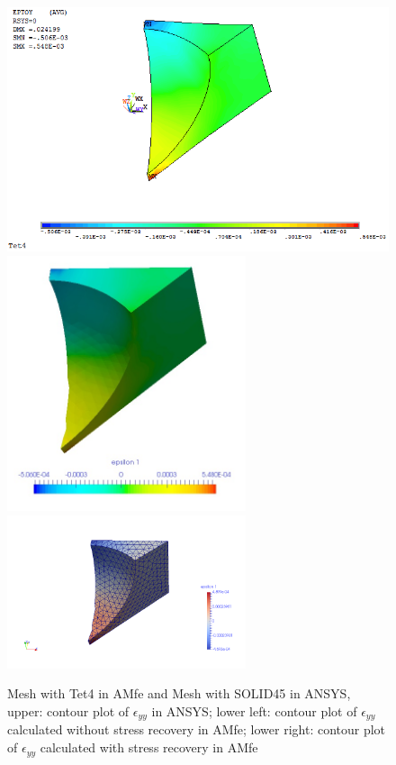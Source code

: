 \begin{figure}[htbp]
	\begin{center}
		\includegraphics[width=13cm,clip]{Tet4Eyy.png} 		
		\includegraphics[width=7cm,clip]{Tet4EyyPD.png} 
		\includegraphics[width=7cm,clip]{Tet4EyyP.png} 		
		\caption{Mesh with Tet4 in AMfe and Mesh with SOLID45 in ANSYS, upper: contour plot of $\epsilon_{yy}$ in ANSYS; lower left: contour plot of $\epsilon_{yy}$ calculated without stress recovery in AMfe; lower right: contour plot of $\epsilon_{yy}$ calculated with stress recovery in AMfe} \label{fig: Tet4_Eyy}
	\end{center}
\end{figure}
\clearpage 


